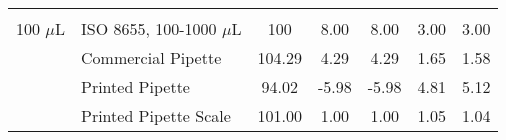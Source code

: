 \documentclass{nature}
\begin{document}
\begin{table}
\begin{adjustwidth}{-0.75in}{0in}
\begin{tabular}{llccccc}
&                       &         &                  &              &              &               \\
100 $\mu$L  & ISO 8655, 100-1000 $\mu$L & 100     & 8.00             & 8.00         & 3.00         & 3.00          \\
& Commercial Pipette    & 104.29  & 4.29             & 4.29         & 1.65         & 1.58          \\
& Printed Pipette       & 94.02   & -5.98            & -5.98        & 4.81         & 5.12          \\
& Printed Pipette Scale & 101.00  & 1.00             & 1.00         & 1.05         & 1.04         
\end{tabular}
\end{adjustwidth}
\end{table}
\end{document}
